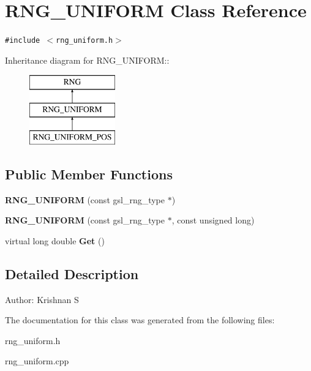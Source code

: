\section{RNG\_\-UNIFORM Class Reference}
\label{classRNG__UNIFORM}
{\tt \#include $<$rng\_\-uniform.h$>$}

Inheritance diagram for RNG\_\-UNIFORM::\begin{figure}[H]
\begin{center}
\leavevmode
\includegraphics[height=3cm]{classRNG__UNIFORM}
\end{center}
\end{figure}
\subsection*{Public Member Functions}
\begin{CompactItemize}
\item 
\textbf{RNG\_\-UNIFORM} (const gsl\_\-rng\_\-type $\ast$)\label{classRNG__UNIFORM_7b87b63759759c2ceaeb5c66544d60b2}

\item 
\textbf{RNG\_\-UNIFORM} (const gsl\_\-rng\_\-type $\ast$, const unsigned long)\label{classRNG__UNIFORM_b74facd380f0729c381199534f5056f4}

\item 
virtual long double \textbf{Get} ()\label{classRNG__UNIFORM_6ce3b4be6c400c9f753914605f129ce3}

\end{CompactItemize}


\subsection{Detailed Description}
\begin{Desc}
\item[Author:]Krishnan S \end{Desc}




The documentation for this class was generated from the following files:\begin{CompactItemize}
\item 
rng\_\-uniform.h\item 
rng\_\-uniform.cpp\end{CompactItemize}
